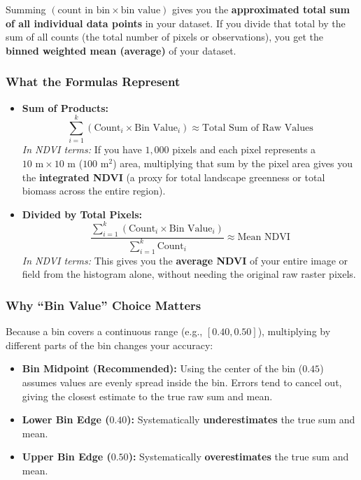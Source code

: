 \documentclass[12pt, letterpaper]{article}
\begin{document}
Summing $(\text{count in bin} \times \text{bin value})$ gives you the \textbf{approximated total sum of all individual data points} in your dataset. If you divide that total by the sum of all counts (the total number of pixels or observations), you get the \textbf{binned weighted mean (average)} of your dataset.

\subsubsection*{What the Formulas Represent}

\begin{itemize}
    \item \textbf{Sum of Products:}
    \begin{equation}
        \sum_{i=1}^{k} \left(\text{Count}_i \times \text{Bin Value}_i\right) \approx \text{Total Sum of Raw Values}
    \end{equation}
    \textit{In NDVI terms:} If you have $1{,}000$ pixels and each pixel represents a $10\text{ m} \times 10\text{ m}$ ($100\text{ m}^2$) area, multiplying that sum by the pixel area gives you the \textbf{integrated NDVI} (a proxy for total landscape greenness or total biomass across the entire region).

    \item \textbf{Divided by Total Pixels:}
    \begin{equation}
        \frac{\sum_{i=1}^{k} \left(\text{Count}_i \times \text{Bin Value}_i\right)}{\sum_{i=1}^{k} \text{Count}_i} \approx \text{Mean NDVI}
    \end{equation}
    \textit{In NDVI terms:} This gives you the \textbf{average NDVI} of your entire image or field from the histogram alone, without needing the original raw raster pixels.
\end{itemize}

\subsubsection*{Why ``Bin Value'' Choice Matters}

Because a bin covers a continuous range (e.g., $[0.40, 0.50]$), multiplying by different parts of the bin changes your accuracy:

\begin{itemize}
    \item \textbf{Bin Midpoint (Recommended):} Using the center of the bin ($0.45$) assumes values are evenly spread inside the bin. Errors tend to cancel out, giving the closest estimate to the true raw sum and mean.
    \item \textbf{Lower Bin Edge ($0.40$):} Systematically \textbf{underestimates} the true sum and mean.
    \item \textbf{Upper Bin Edge ($0.50$):} Systematically \textbf{overestimates} the true sum and mean.
\end{itemize}
\end{document}
